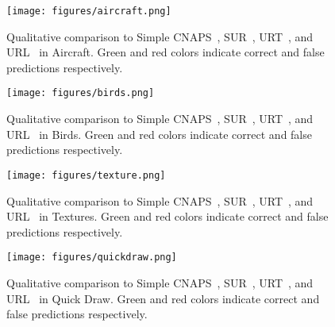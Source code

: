 \begin{figure}[h!]
\begin{center}
\texttt{[image: figures/aircraft.png]}
\end{center}
\vspace{-0.3in}
\caption{Qualitative comparison to Simple CNAPS~\cite{bateni2020improved}, SUR~\cite{dvornik2020selecting}, URT~\cite{liu2020universal}, and URL~\cite{li2021universal} in Aircraft. Green and red colors indicate correct and false predictions respectively.}
\label{suppfig:aircraft}
\end{figure}

\begin{figure}[h!]
\begin{center}
\texttt{[image: figures/birds.png]}
\end{center}
\vspace{-0.3in}
\caption{Qualitative comparison to Simple CNAPS~\cite{bateni2020improved}, SUR~\cite{dvornik2020selecting}, URT~\cite{liu2020universal}, and URL~\cite{li2021universal} in Birds. Green and red colors indicate correct and false predictions respectively.}
\label{suppfig:birds}
\end{figure}

\begin{figure}[h!]
\begin{center}
\texttt{[image: figures/texture.png]}
\end{center}
\vspace{-0.3in}
\caption{Qualitative comparison to Simple CNAPS~\cite{bateni2020improved}, SUR~\cite{dvornik2020selecting}, URT~\cite{liu2020universal}, and URL~\cite{li2021universal} in Textures. Green and red colors indicate correct and false predictions respectively.}
\label{suppfig:texture}
\end{figure}

\begin{figure}[h!]
\begin{center}
\texttt{[image: figures/quickdraw.png]}
\end{center}
\vspace{-0.3in}
\caption{Qualitative comparison to Simple CNAPS~\cite{bateni2020improved}, SUR~\cite{dvornik2020selecting}, URT~\cite{liu2020universal}, and URL~\cite{li2021universal} in Quick Draw. Green and red colors indicate correct and false predictions respectively.}
\label{suppfig:quickdraw}
\end{figure}

